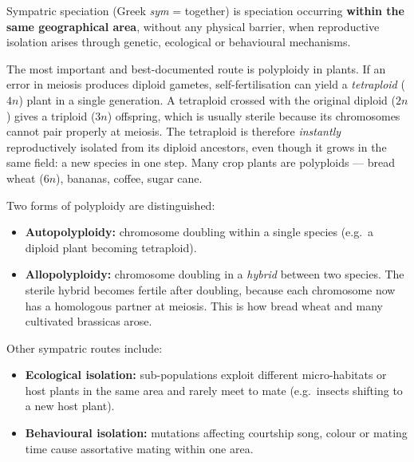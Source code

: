 \documentclass[11pt]{article}
\newcommand{\cle}[1]{{\popxbold\color{popdark}#1}}
\begin{document}
\begin{definition}
\cle{Sympatric speciation} (Greek \emph{sym} = together) is speciation occurring \textbf{within the same geographical area}, without any physical barrier, when reproductive isolation arises through genetic, ecological or behavioural mechanisms.
\end{definition}

The most important and best-documented route is \cle{polyploidy} in plants. If an error in meiosis produces diploid gametes, self-fertilisation can yield a \emph{tetraploid} ($4n$) plant in a single generation. A tetraploid crossed with the original diploid ($2n$) gives a triploid ($3n$) offspring, which is usually sterile because its chromosomes cannot pair properly at meiosis. The tetraploid is therefore \emph{instantly} reproductively isolated from its diploid ancestors, even though it grows in the same field: a new species in one step. Many crop plants are polyploids --- bread wheat ($6n$), bananas, coffee, sugar cane.

Two forms of polyploidy are distinguished:
\begin{itemize}
\item \textbf{Autopolyploidy:} chromosome doubling within a single species (e.g.\ a diploid plant becoming tetraploid).
\item \textbf{Allopolyploidy:} chromosome doubling in a \emph{hybrid} between two species. The sterile hybrid becomes fertile after doubling, because each chromosome now has a homologous partner at meiosis. This is how bread wheat and many cultivated brassicas arose.
\end{itemize}

Other sympatric routes include:
\begin{itemize}
\item \textbf{Ecological isolation:} sub-populations exploit different micro-habitats or host plants in the same area and rarely meet to mate (e.g.\ insects shifting to a new host plant).
\item \textbf{Behavioural isolation:} mutations affecting courtship song, colour or mating time cause assortative mating within one area.
\end{itemize}
\end{document}
